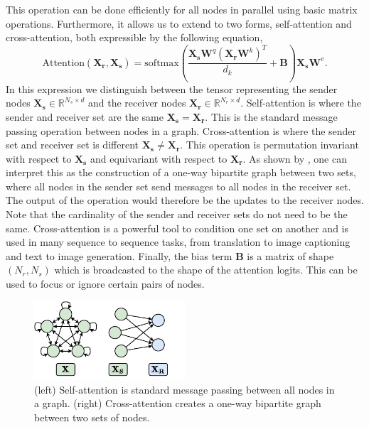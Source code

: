 This operation can be done efficiently for all nodes in parallel using basic matrix operations.
Furthermore, it allows us to extend to two forms, self-attention and cross-attention, both expressible by the following equation,
\begin{equation}
    \label{eq:attention}
    \text{Attention}(\mathbf{X_r}, \mathbf{X_s}) = \text{softmax}\left(\frac{\mathbf{X_s} \mathbf{W}^q (\mathbf{X_r} \mathbf{W}^k)^T}{d_k} + \mathbf{B}\right) \mathbf{X_s} \mathbf{W}^v.
\end{equation}
In this expression we distinguish between the tensor representing the sender nodes $\mathbf{X_s} \in \mathbb{R}^{N_s \times d}$ and the receiver nodes $\mathbf{X_r} \in \mathbb{R}^{N_r \times d}$.
Self-attention is where the sender and receiver set are the same $\mathbf{X_s} = \mathbf{X_r}$.
This is the standard message passing operation between nodes in a graph.
Cross-attention is where the sender set and receiver set is different $\mathbf{X_s} \neq \mathbf{X_r}$.
This operation is permutation invariant with respect to $\mathbf{X_s}$ and equivariant with respect to $\mathbf{X_r}$.
As shown by , one can interpret this as the construction of a one-way bipartite graph between two sets, where all nodes in the sender set send messages to all nodes in the receiver set.
The output of the operation would therefore be the updates to the receiver nodes.
Note that the cardinality of the sender and receiver sets do not need to be the same.
Cross-attention is a powerful tool to condition one set on another and is used in many sequence to sequence tasks, from translation to image captioning and text to image generation.
Finally, the bias term $\mathbf{B}$ is a matrix of shape $(N_r, N_s)$ which is broadcasted to the shape of the attention logits.
This can be used to focus or ignore certain pairs of nodes.

\begin{figure}
    \centering
    \includegraphics[width=0.5\textwidth]{Figures/transformers/bipartite.pdf}
    \caption{(left) Self-attention is standard message passing between all nodes in a graph. (right) Cross-attention creates a one-way bipartite graph between two sets of nodes.}
    \label{fig:bipartite}
\end{figure}

